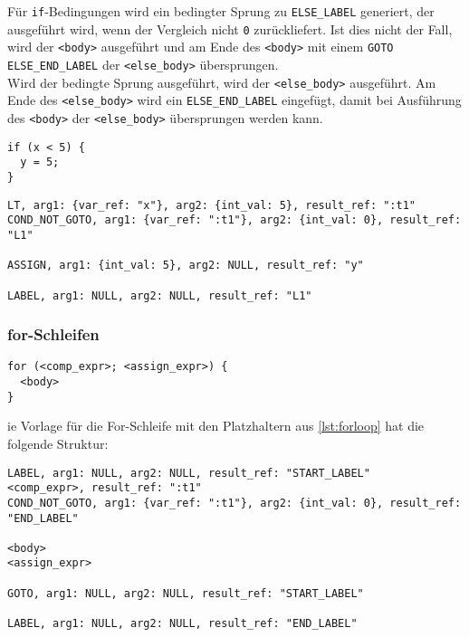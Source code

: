 Für \texttt{if}-Bedingungen wird ein bedingter Sprung zu \texttt{ELSE\_LABEL} generiert, der ausgeführt wird, wenn der Vergleich nicht \texttt{0} zurückliefert.
Ist dies nicht der Fall, wird der \texttt{<body>} ausgeführt und am Ende des \texttt{<body>} mit einem \texttt{GOTO ELSE\_END\_LABEL}  der \texttt{<else\_body>} übersprungen.\\
Wird der bedingte Sprung ausgeführt, wird der \texttt{<else\_body>} ausgeführt.
Am Ende des \texttt{<else\_body>} wird ein \texttt{ELSE\_END\_LABEL} eingefügt, damit bei Ausführung des \texttt{<body>} der \texttt{<else\_body>} übersprungen werden kann.\\


\begin{lstlisting}[caption={Beispiel if-Bedingung}]
if (x < 5) {
  y = 5;
}
\end{lstlisting}

\begin{lstlisting}[caption={Drei-Adressen Code für die if-Bedingung}]
LT, arg1: {var_ref: "x"}, arg2: {int_val: 5}, result_ref: ":t1"
COND_NOT_GOTO, arg1: {var_ref: ":t1"}, arg2: {int_val: 0}, result_ref: "L1"

ASSIGN, arg1: {int_val: 5}, arg2: NULL, result_ref: "y"

LABEL, arg1: NULL, arg2: NULL, result_ref: "L1"
\end{lstlisting}

\subsubsection{for-Schleifen}

\begin{lstlisting}[caption={Beispielschleife}, label={lst:forloop}]
for (<comp_expr>; <assign_expr>) {
  <body>
}
\end{lstlisting}

ie Vorlage für die For-Schleife mit den Platzhaltern aus \autoref{lst:forloop} hat die folgende Struktur:

\begin{lstlisting}[caption={Drei-Adressen Code für for-Schleifen}]
LABEL, arg1: NULL, arg2: NULL, result_ref: "START_LABEL"
<comp_expr>, result_ref: ":t1"
COND_NOT_GOTO, arg1: {var_ref: ":t1"}, arg2: {int_val: 0}, result_ref: "END_LABEL"

<body>
<assign_expr>

GOTO, arg1: NULL, arg2: NULL, result_ref: "START_LABEL"

LABEL, arg1: NULL, arg2: NULL, result_ref: "END_LABEL"
\end{lstlisting}

